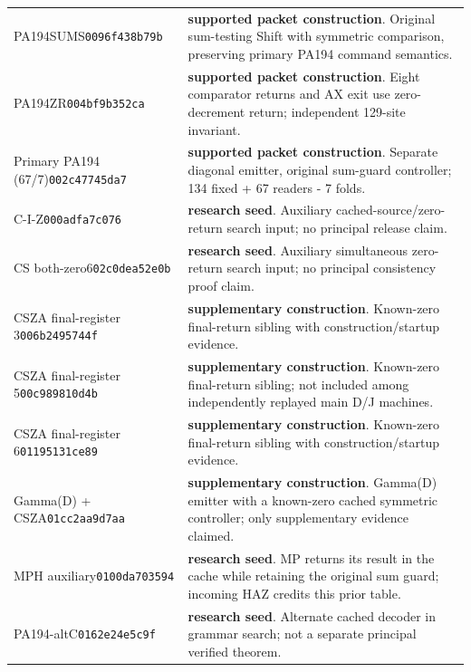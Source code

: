 \begin{longtable}{p{.28\linewidth}p{.64\linewidth}}
PA194SUMS\newline\texttt{0096f438b79b} & \textbf{supported packet construction}. Original sum-testing Shift with symmetric comparison, preserving primary PA194 command semantics.\\[5pt]
PA194ZR\newline\texttt{004bf9b352ca} & \textbf{supported packet construction}. Eight comparator returns and AX exit use zero-decrement return; independent 129-site invariant.\\[5pt]
Primary PA194 (67/7)\newline\texttt{002c47745da7} & \textbf{supported packet construction}. Separate diagonal emitter, original sum-guard controller; 134 fixed + 67 readers - 7 folds.\\[5pt]
C-I-Z\newline\texttt{000adfa7c076} & \textbf{research seed}. Auxiliary cached-source/zero-return search input; no principal release claim.\\[5pt]
CS both-zero6\newline\texttt{02c0dea52e0b} & \textbf{research seed}. Auxiliary simultaneous zero-return search input; no principal consistency proof claim.\\[5pt]
CSZA final-register 3\newline\texttt{006b2495744f} & \textbf{supplementary construction}. Known-zero final-return sibling with construction/startup evidence.\\[5pt]
CSZA final-register 5\newline\texttt{00c989810d4b} & \textbf{supplementary construction}. Known-zero final-return sibling; not included among independently replayed main D/J machines.\\[5pt]
CSZA final-register 6\newline\texttt{01195131ce89} & \textbf{supplementary construction}. Known-zero final-return sibling with construction/startup evidence.\\[5pt]
Gamma(D) + CSZA\newline\texttt{01cc2aa9d7aa} & \textbf{supplementary construction}. Gamma(D) emitter with a known-zero cached symmetric controller; only supplementary evidence claimed.\\[5pt]
MPH auxiliary\newline\texttt{0100da703594} & \textbf{research seed}. MP returns its result in the cache while retaining the original sum guard; incoming HAZ credits this prior table.\\[5pt]
PA194-altC\newline\texttt{0162e24e5c9f} & \textbf{research seed}. Alternate cached decoder in grammar search; not a separate principal verified theorem.\\[5pt]

\end{longtable}
